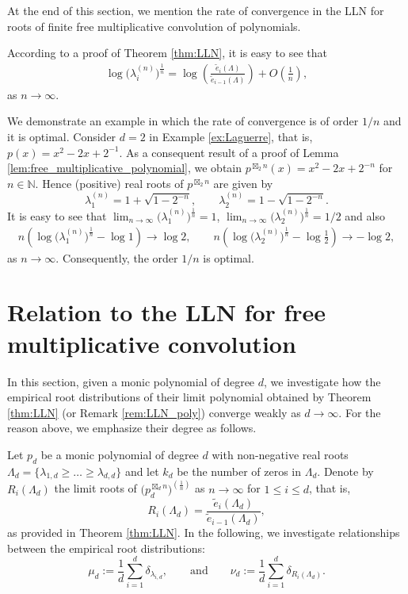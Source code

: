 \documentclass[pdftex]{sigma}
\numberwithin{equation}{section}
\newcommand{\N}{\mathbb{N}}   %
\begin{document}
At the end of this section, we mention the rate of convergence in the LLN for roots of finite free multiplicative convolution of polynomials.

\begin{Remark}
According to a proof of Theorem \ref{thm:LLN}, it is easy to see that
\begin{align*}
\log \big(\lambda_i^{(n)}\big)^{\frac{1}{n}} = \log \left(\frac{\widetilde{e}_i(\Lambda)}{\widetilde{e}_{i-1}(\Lambda)}\right)
+ O\left(\frac{1}{n}\right),
\end{align*}
as $n\rightarrow\infty$.

We demonstrate an example in which the rate of convergence is of order $1/n$ and it is optimal. Consider $d=2$ in Example \ref{ex:Laguerre}, that is, $p(x)=x^2-2x+2^{-1}$. As a consequent result of a proof of Lemma \ref{lem:free_multiplicative_polynomial}, we obtain $p^{\boxtimes_2 n} (x)=x^2-2x+2^{-n}$ for $n\in\N$. Hence (positive) real roots of $p^{\boxtimes_2 n}$ are given by
\[
\lambda_1^{(n)}=1+\sqrt{1-2^{-n}}, \qquad \lambda_2^{(n)}=1-\sqrt{1-2^{-n}}.
\]
It is easy to see that $\lim_{n\rightarrow\infty} \big(\lambda_1^{(n)}\big)^{\frac{1}{n}}=1$, $\lim_{n\rightarrow\infty} \big(\lambda_2^{(n)}\big)^{\frac{1}{n}} =1/2$ and also
\begin{align*}
n \left( \log\big(\lambda_1^{(n)}\big)^{\frac{1}{n}} - \log 1 \right) \rightarrow \log 2, \qquad
n\left(\log \big(\lambda_2^{(n)}\big)^{\frac{1}{n}} - \log \frac{1}{2} \right) \rightarrow -\log2,
\end{align*}
as $n\rightarrow\infty$. Consequently, the order $1/n$ is optimal.
\end{Remark}



\section{Relation to the LLN for free multiplicative convolution}\label{section4}

In this section, given a monic polynomial of degree $d$, we investigate how the empirical root distributions of their limit polynomial obtained by Theorem \ref{thm:LLN} (or Remark \ref{rem:LLN_poly}) converge weakly as $d\rightarrow\infty$. For the reason above, we emphasize their degree as follows.


Let $p_d$ be a monic polynomial of degree $d$ with non-negative real roots $\Lambda_d = \{\lambda_{1,d}\ge \dots \ge \lambda_{d,d}\}$ and let $k_d$ be the number of zeros in $\Lambda_d$.
Denote by $R_i(\Lambda_d)$ the limit roots of $\big(p_d^{\boxtimes_d n}\big)^{\left(\frac{1}{n}\right)}$ as $n\rightarrow\infty$ for $1\le i \le d$, that is,
\[
R_i(\Lambda_d) = \frac{\tilde{e}_i(\Lambda_d)}{\tilde{e}_{i-1}(\Lambda_d)},
\]
as provided in Theorem \ref{thm:LLN}.
In the following, we investigate relationships between the empirical root distributions:
\[
\mu_d:=\frac{1}{d}\sum_{i=1}^d \delta_{\lambda_{i,d}}, \qquad \text{and} \qquad \nu_d:=\frac{1}{d}\sum_{i=1}^d \delta_{R_{i}(\Lambda_d)}.
\]
\end{document}
